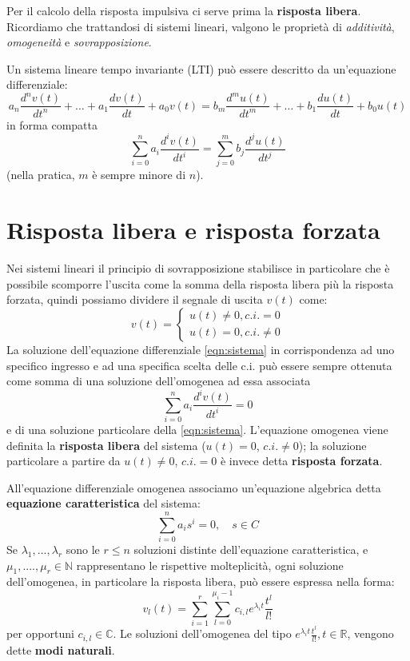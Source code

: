 \documentclass[a4paper, titlepage, oneside]{scrbook}
\begin{document}
Per il calcolo della risposta impulsiva ci serve prima la \textbf{risposta libera}.
Ricordiamo che trattandosi di sistemi lineari, valgono le proprietà di \textit{additività}, \textit{omogeneità} e \textit{sovrapposizione}.

Un sistema lineare tempo invariante (LTI) può essere descritto da un'equazione differenziale:
$$
	a_n\frac{d^nv(t)}{dt^n} + \ldots + a_1\frac{dv(t)}{dt} + a_0v(t) = b_m\frac{d^mu(t)}{dt^m} + \ldots + b_1\frac{du(t)}{dt} + b_0u(t)
$$
in forma compatta
\begin{equation}
	\sum_{i=0}^{n}a_i\frac{d^iv(t)}{dt^i} = \sum_{j=0}^{m}b_j\frac{d^ju(t)}{dt^j}
	\label{eqn:sistema}
\end{equation}
(nella pratica, $m$ è sempre minore di $n$).

\section{Risposta libera e risposta forzata}
Nei sistemi lineari il principio di sovrapposizione stabilisce in particolare che è possibile scomporre l'uscita come la somma della risposta libera più la risposta forzata, quindi possiamo dividere il segnale di uscita $v(t)$ come:
$$
	v(t)=
		\begin{cases}
		u(t) \ne 0, c.i. = 0\\
		u(t) = 0, c.i. \ne 0
		\end{cases}
$$
La soluzione dell'equazione differenziale \ref{eqn:sistema} in corrispondenza ad uno specifico ingresso e ad una specifica scelta delle c.i. può essere sempre ottenuta come somma di una soluzione dell'omogenea ad essa associata
\begin{equation}
	\sum_{i=0}^{n}a_i\frac{d^iv(t)}{dt^i}=0
	\label{eqn:omogenea_associata}
\end{equation}
e di una soluzione particolare della \ref{eqn:sistema}.
L'equazione omogenea viene definita la \textbf{risposta libera} del sistema ($u(t)=0$, $c.i.\ne 0$); la soluzione particolare a partire da $u(t)\ne 0$, $c.i.=0$ è invece detta \textbf{risposta forzata}.

All'equazione differenziale omogenea associamo un’equazione algebrica detta \textbf{equazione caratteristica} del sistema:
\begin{equation*}
	\sum_{i=0}^{n}a_is^i=0, \quad s \in C
\end{equation*}
Se $\lambda_1,...,\lambda_r$ sono le $r\leq n$ soluzioni distinte dell'equazione caratteristica, e $\mu_1,....,\mu_r \in \mathbb{N}$ rappresentano le rispettive molteplicità, ogni soluzione dell'omogenea, in particolare la risposta libera, può essere espressa nella forma:
\begin{equation}
	v_l(t)=\sum_{i=1}^{r}\sum_{l=0}^{\mu_i-1}c_{i,l}e^{\lambda_it}\frac{t^l}{l!}
	\label{eqn:risposta_libera}
\end{equation}
per opportuni $c_{i,l} \in \mathbb{C}$. Le soluzioni dell'omogenea del tipo $e^{\lambda_it}\frac{t^l}{l!}, t \in \mathbb{R}$, vengono dette \textbf{modi naturali}.
\end{document}
